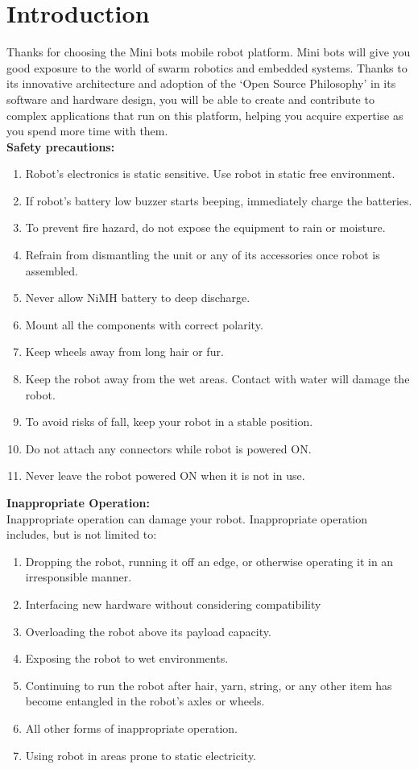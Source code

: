 \documentclass[a4paper,12pt,oneside]{book}
\begin{document}
	\chapter{Introduction}
	Thanks for choosing the Mini bots mobile robot platform. Mini bots will give you good
	exposure to the world of swarm robotics and embedded systems. Thanks to its innovative architecture
	and adoption of the ‘Open Source Philosophy’ in its software and hardware design, you will be
	able to create and contribute to complex applications that run on this platform, helping you
	acquire expertise as you spend more time with them.\\
	\textbf{Safety precautions:}
	\begin{enumerate}
	\item Robot’s electronics is static sensitive. Use robot in static free environment.
	\item If robot’s battery low buzzer starts beeping, immediately charge the batteries.
	\item To prevent fire hazard, do not expose the equipment to rain or moisture.
	\item Refrain from dismantling the unit or any of its accessories once robot is assembled.
	\item Never allow NiMH battery to deep discharge.
	\item Mount all the components with correct polarity.
	\item Keep wheels away from long hair or fur.
	\item Keep the robot away from the wet areas. Contact with water will damage the robot.
	\item To avoid risks of fall, keep your robot in a stable position.
	\item Do not attach any connectors while robot is powered ON.
	\item Never leave the robot powered ON when it is not in use.
\end{enumerate}
\textbf{Inappropriate Operation:}\\
Inappropriate operation can damage your robot. Inappropriate operation includes, but is not
limited to:
	\begin{enumerate}		
	\item Dropping the robot, running it off an edge, or otherwise operating it in an irresponsible
	manner.
	\item Interfacing new hardware without considering compatibility
	\item Overloading the robot above its payload capacity.
	\item Exposing the robot to wet environments.
	\item Continuing to run the robot after hair, yarn, string, or any other item has become
	entangled in the robot’s axles or wheels.
	\item All other forms of inappropriate operation.
	\item Using robot in areas prone to static electricity.
\end{enumerate}
	
\end{document}
